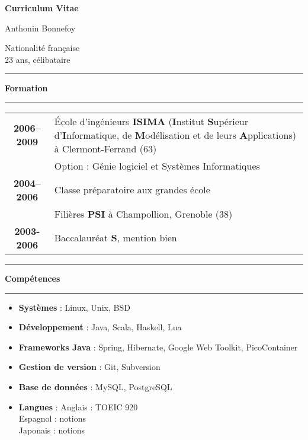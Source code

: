 \documentclass[a4paper,11pt]{article}
\newcommand{\titre}[1]{%
	\begin{center}
	\bigskip
	\rule{\textwidth}{1pt}
	\par\vspace{0.1cm}
        \textbf{\LARGE #1}
	\par\rule{\textwidth}{1pt}
	\end{center}
	\bigskip
}
\begin{document}
\begin{center}
\par\textbf{\huge Curriculum Vitae}
\end{center}

\vspace{1.5cm}


\begin{minipage}{0.48\linewidth}
\begin{flushleft}
Anthonin Bonnefoy\\
\end{flushleft}
\end{minipage}
\hfill
\begin{minipage}{0.48\linewidth}
\begin{flushright}
Nationalité française \\
23 ans, célibataire
\end{flushright}
\end{minipage}

\titre{Formation}

\begin{tabular}{c@{ }p{}}

\textbf{2006--2009} &  École d'ingénieurs \textbf{ISIMA} (\textbf{I}nstitut \textbf{S}upérieur d'\textbf{I}nformatique, de \textbf{M}odélisation et de leurs \textbf{A}pplications) à Clermont-Ferrand (63)\\
& Option : Génie logiciel et Systèmes Informatiques\\

\textbf{2004--2006} &  Classe préparatoire aux grandes école\\
&  Filières \textbf{PSI} à Champollion, Grenoble (38)\\

\textbf{2003-2006} &  Baccalauréat \textbf{S}, mention bien

\end{tabular}

\titre{Compétences}
\begin{itemize} 
\item \textbf{Systèmes} : Linux, Unix, BSD 
\item \textbf{Développement} : Java, Scala, Haskell, Lua
\item \textbf{Frameworks Java} : Spring, Hibernate, Google Web Toolkit, PicoContainer
\item \textbf{Gestion de version} : Git, Subversion
\item \textbf{Base de données} : MySQL, PostgreSQL
\item \textbf{Langues} : Anglais : TOEIC 920\\
          Espagnol : notions\\
          Japonais : notions
\end{itemize}
\end{document}
